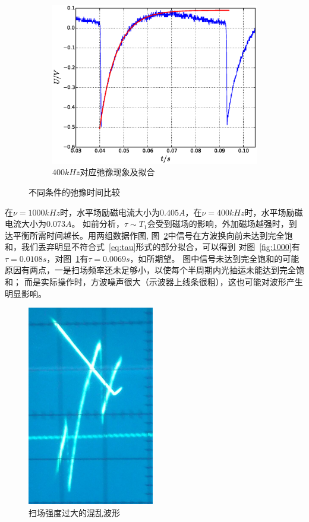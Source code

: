 \documentclass[11pt,a4paper]{article}
\begin{document}
\begin{spacing}{1.3}
\begin{CJK*}{UTF8}{gbsn}
\begin{figure}[h!]
\begin{subfigure}{0.50\textwidth}
\includegraphics[width=\linewidth]{1112c}
\caption{$400kHz$对应弛豫现象及拟合}
\label{fig:400}
\end{subfigure}
\caption{不同条件的弛豫时间比较}\label{fig:comt}
\end{figure}
在$\nu=1000kHz$时，水平场励磁电流大小为$0.405A$，在$\nu=400kHz$时，水平场励磁电流大小为$0.073A$。
如前分析，$\tau\sim T_1$会受到磁场的影响，外加磁场越强时，到达平衡所需时间越长。用两组数据作图,
图~\ref{fig:comt}中信号在方波换向前未达到完全饱和，我们丢弃明显不符合式~\eqref{eq:tau}形式的部分拟合，可以得到
对图~\ref{fig:1000}有$\tau = 0.0108s$，对图~\ref{fig:400}有$\tau = 0.0069s$，如所期望。
图中信号未达到完全饱和的可能原因有两点，一是扫场频率还未足够小，以使每个半周期内光抽运未能达到完全饱和；
而是实际操作时，方波噪声很大（示波器上线条很粗），这也可能对波形产生明显影响。\par 


\begin{figure}[h]
\centering
\includegraphics[width=.2\textwidth]{chaos}
\caption{扫场强度过大的混乱波形}
\label{fig:chaos}
\end{figure}

\end{CJK*}
\end{spacing}
\end{document}
